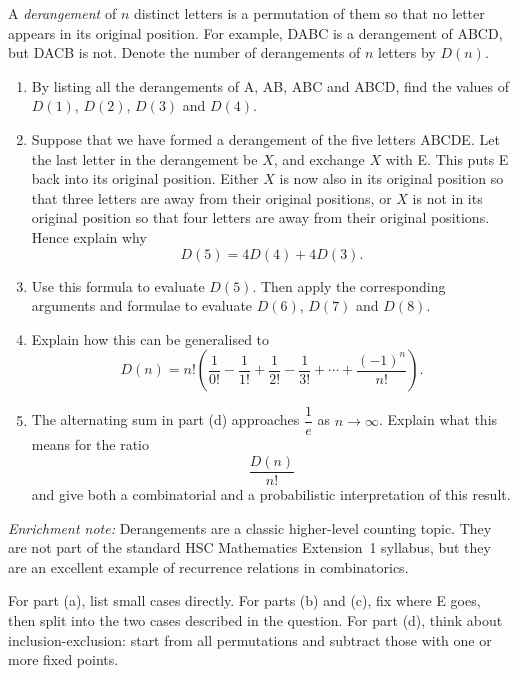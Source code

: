 \begin{problem}[Derangements]
A \emph{derangement} of $n$ distinct letters is a permutation of them so that no letter appears in its original position. For example, DABC is a derangement of ABCD, but DACB is not. Denote the number of derangements of $n$ letters by $D(n)$.

\begin{enumerate}[label=\alph*)]
\item By listing all the derangements of A, AB, ABC and ABCD, find the values of $D(1)$, $D(2)$, $D(3)$ and $D(4)$.

\item Suppose that we have formed a derangement of the five letters ABCDE. Let the last letter in the derangement be $X$, and exchange $X$ with E. This puts E back into its original position. Either $X$ is now also in its original position so that three letters are away from their original positions, or $X$ is not in its original position so that four letters are away from their original positions. Hence explain why
\[
D(5)=4D(4)+4D(3).
\]

\item Use this formula to evaluate $D(5)$. Then apply the corresponding arguments and formulae to evaluate $D(6)$, $D(7)$ and $D(8)$.

\item Explain how this can be generalised to
\[
D(n)=n!\left(\frac{1}{0!}-\frac{1}{1!}+\frac{1}{2!}-\frac{1}{3!}+\cdots+\frac{(-1)^n}{n!}\right).
\]

\item The alternating sum in part (d) approaches $\dfrac1e$ as $n\to\infty$. Explain what this means for the ratio
\[
\frac{D(n)}{n!}
\]
and give both a combinatorial and a probabilistic interpretation of this result.
\end{enumerate}

\noindent\textit{Enrichment note:} Derangements are a classic higher-level counting topic. They are not part of the standard HSC Mathematics Extension~1 syllabus, but they are an excellent example of recurrence relations in combinatorics.
\end{problem}

\begin{hint}
For part (a), list small cases directly. For parts (b) and (c), fix where E goes, then split into the two cases described in the question. For part (d), think about inclusion-exclusion: start from all permutations and subtract those with one or more fixed points.
\end{hint}

